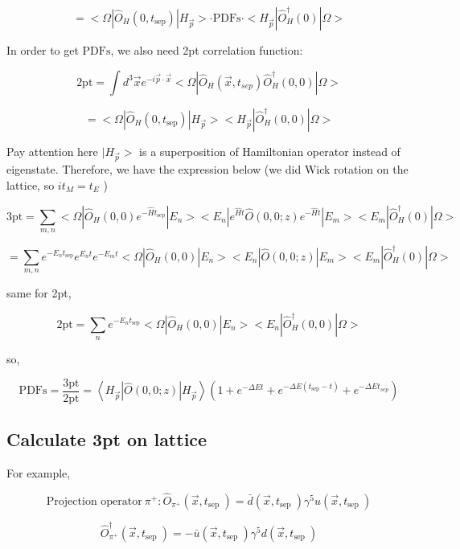 \documentclass[11pt]{article} %
\begin{document}
\[ = <\Omega |\hat{O}_{H} (0, t_{\text{sep}})  |H_{\vec{p}}> \cdot \text{PDFs} \cdot <H_{\vec{p}}| \hat{O}_{H}^{\dagger}(0) | \Omega> \]

In order to get $\text{PDFs}$, we also need 2pt correlation function:

\[ \text{2pt} = \int d^{3} \vec{x} e^{-i \vec{p} \cdot \vec{x}} <\Omega |\hat{O}_{H}\left(\vec{x}, t_{s e p}\right) \hat{O}_{H}^{\dagger}(0,0) | \Omega> \]

\[ = <\Omega |\hat{O}_{H} (0, t_{\text{sep}})  |H_{\vec{p}}>  <H_{\vec{p}}| \hat{O}_{H}^{\dagger}(0, 0) | \Omega> \]

{\color{red} Pay attention here $|H_{\vec{p}}>$ is a superposition of Hamiltonian operator instead of eigenstate. Therefore, we have the expression below (we did Wick rotation on the lattice, so $it_{M} = t_{E}$ ) }

\[ \text{3pt} = \sum_{m, n} <\Omega |\hat{O}_{H} (0, 0) e^{- \hat{H} t_{\text{sep}}}  |E_n><E_n| e^{\hat{H} t } \hat{O}(0, 0; z) e^{- \hat{H} t} |E_m><E_m| \hat{O}_{H}^{\dagger}(0) | \Omega>  \]

\[ = \sum_{m, n} e^{- E_n t_{\text{sep}}} e^{E_n t } e^{- E_m t} <\Omega |\hat{O}_{H} (0, 0)  |E_n><E_n|  \hat{O}(0, 0; z) |E_m><E_m| \hat{O}_{H}^{\dagger}(0) | \Omega> \]


same for 2pt,

\[ \text{2pt} =  \sum_{n} e^{- E_n t_{\text{sep}}} <\Omega |\hat{O}_{H} (0, 0)  |E_n>  <E_n| \hat{O}_{H}^{\dagger}(0, 0) | \Omega>  \]

so,

\[ \text{PDFs} = \frac{\text{3pt}}{\text{2pt}} = \left\langle H_{\vec{p}}|\hat{O}(0,0 ; z)| H_{\vec{p}}\right\rangle\left(1+e^{-\Delta E t}+e^{-\Delta E(t_{\text{sep}}-t)}+e^{-\Delta E t_{s e p}}\right) \]


\subsection{Calculate 3pt on lattice}

For example,

\[ \text{Projection operator}\ \pi^+: \hat{O}_{\pi^+}\left(\vec{x}, t_{\text {sep }}\right)=\bar{d}\left(\vec{x}, t_{\text {sep }}\right) \gamma^{5} u\left(\vec{x}, t_{\text {sep }}\right) \]

\[ \hat{O}^{\dagger}_{\pi^+}\left(\vec{x}, t_{\text {sep }}\right)=- \bar{u}\left(\vec{x}, t_{\text {sep }}\right) \gamma^{5} d\left(\vec{x}, t_{\text {sep }}\right) \]
\end{document}
